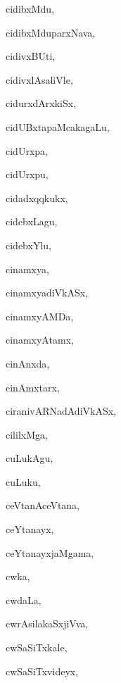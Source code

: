 \begin{multicols}{3}
{\noindent
{cidibxMdu}, \pageref{cidibxMdu}

\noindent
{cidibxMduparxNava}, \pageref{cidibxMduparxNava}

\noindent
{cidivxBUti}, \pageref{cidivxBUti}

\noindent
{cidivxlAsaliVle}, \pageref{cidivxlAsaliVle}

\noindent
{cidurxdArxkiSx}, \pageref{cidurxdArxkiSx}

\noindent
{cidUBxtapaMcakagaLu}, \pageref{cidUBxtapaMcakagaLu}

\noindent
{cidUrxpa}, \pageref{cidUrxpa}

\noindent
{cidUrxpu}, \pageref{cidUrxpu}

\noindent
{cidadxqqkukx}, \pageref{cidadxqqkukx}

\noindent
{cidebxLagu}, \pageref{cidebxLagu}

\noindent
{cidebxYlu}, \pageref{cidebxYlu}

\noindent
{cinamxya}, \pageref{cinamxya}

\noindent
{cinamxyadiVkASx}, \pageref{cinamxyadiVkASx}

\noindent
{cinamxyAMDa}, \pageref{cinamxyAMDa}

\noindent
{cinamxyAtamx}, \pageref{cinamxyAtamx}

\noindent
{cinAnxda}, \pageref{cinAnxda}

\noindent
{cinAmxtarx}, \pageref{cinAmxtarx}

\noindent
{ciranivARNadAdiVkASx}, \pageref{ciranivARNadAdiVkASx}

\noindent
{cililxMga}, \pageref{cililxMga}

\noindent
{cuLukAgu}, \pageref{cuLukAgu}

\noindent
{cuLuku}, \pageref{cuLuku}

\noindent
{ceVtanAceVtana}, \pageref{ceVtanAceVtana}

\noindent
{ceYtanayx}, \pageref{ceYtanayx}

\noindent
{ceYtanayxjaMgama}, \pageref{ceYtanayxjaMgama}

\noindent
{cwka}, \pageref{cwka}

\noindent
{cwdaLa}, \pageref{cwdaLa}

\noindent
{cwrAsilakaSxjiVva}, \pageref{cwrAsilakaSxjiVva}

\noindent
{cwSaSiTxkale}, \pageref{cwSaSiTxkale}

\noindent
{cwSaSiTxvideyx}, \pageref{cwSaSiTxvideyx}

\bigskip
\noindent
{}
\smallskip

}
\end{multicols}
